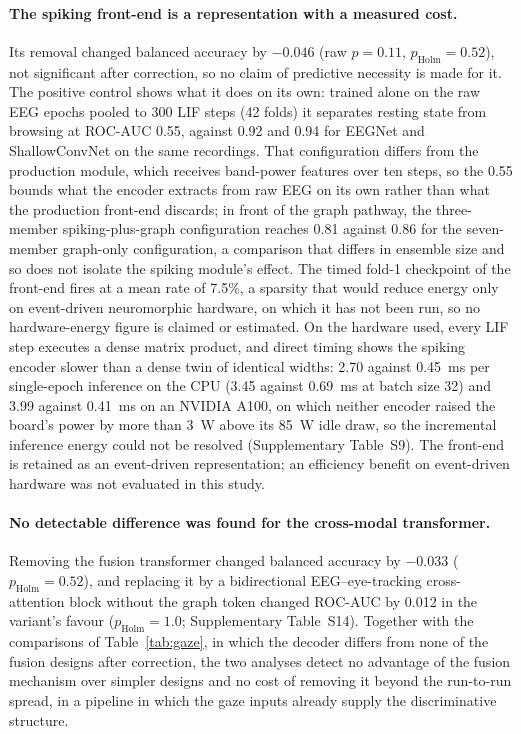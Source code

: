 \documentclass[pdflatex,sn-basic,Numbered,twocolumn,iicol]{sn-jnl}
\theoremstyle{thmstyleone}%
\theoremstyle{thmstyletwo}%
\theoremstyle{thmstylethree}%
\begin{document}
\paragraph{The spiking front-end is a representation with a measured cost.} Its removal changed balanced accuracy by $-0.046$ (raw $p=0.11$, $p_{\mathrm{Holm}}=0.52$), not significant after correction, so no claim of predictive necessity is made for it. The positive control shows what it does on its own: trained alone on the raw EEG epochs pooled to 300 LIF steps (42 folds) it separates resting state from browsing at ROC-AUC 0.55, against 0.92 and 0.94 for EEGNet and ShallowConvNet on the same recordings. That configuration differs from the production module, which receives band-power features over ten steps, so the 0.55 bounds what the encoder extracts from raw EEG on its own rather than what the production front-end discards; in front of the graph pathway, the three-member spiking-plus-graph configuration reaches 0.81 against 0.86 for the seven-member graph-only configuration, a comparison that differs in ensemble size and so does not isolate the spiking module's effect. The timed fold-1 checkpoint of the front-end fires at a mean rate of 7.5\%, a sparsity that would reduce energy only on event-driven neuromorphic hardware, on which it has not been run, so no hardware-energy figure is claimed or estimated. On the hardware used, every LIF step executes a dense matrix product, and direct timing shows the spiking encoder slower than a dense twin of identical widths: 2.70 against 0.45~ms per single-epoch inference on the CPU (3.45 against 0.69~ms at batch size 32) and 3.99 against 0.41~ms on an NVIDIA A100, on which neither encoder raised the board's power by more than 3~W above its 85~W idle draw, so the incremental inference energy could not be resolved (Supplementary Table~S9). The front-end is retained as an event-driven representation; an efficiency benefit on event-driven hardware was not evaluated in this study.

\paragraph{No detectable difference was found for the cross-modal transformer.} Removing the fusion transformer changed balanced accuracy by $-0.033$ ($p_{\mathrm{Holm}}=0.52$), and replacing it by a bidirectional EEG--eye-tracking cross-attention block without the graph token changed ROC-AUC by 0.012 in the variant's favour ($p_{\mathrm{Holm}}=1.0$; Supplementary Table~S14). Together with the comparisons of Table~\ref{tab:gaze}, in which the decoder differs from none of the fusion designs after correction, the two analyses detect no advantage of the fusion mechanism over simpler designs and no cost of removing it beyond the run-to-run spread, in a pipeline in which the gaze inputs already supply the discriminative structure.
\end{document}
